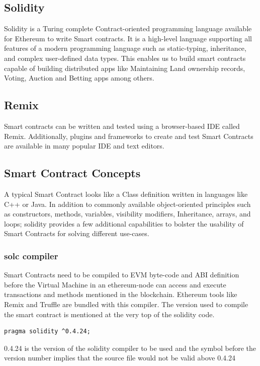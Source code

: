 \documentclass[11pt,openright]{report}
\begin{document}
\subsection{Solidity}
Solidity is a Turing complete Contract-oriented programming language available for Ethereum to write Smart contracts. It is a high-level language supporting all features of a modern programming language such as static-typing, inheritance, and complex user-defined data types. This enables us to build smart contracts capable of building distributed apps like Maintaining Land ownership records, Voting, Auction and Betting apps among others.

\subsection{Remix}
Smart contracts can be written and tested using a browser-based IDE called Remix. Additionally, plugins and frameworks to create and test Smart Contracts are available in many popular IDE and text editors.

\subsection{Smart Contract Concepts}
A typical Smart Contract looks like a Class definition written in languages like C++ or Java. In addition to commonly available object-oriented principles such as constructors, methods, variables, visibility modifiers, Inheritance, arrays, and loops; solidity provides a few additional capabilities to bolster the usability of Smart Contracts for solving different use-cases.

\subsubsection{solc compiler}
Smart Contracts need to be compiled to EVM byte-code and ABI definition before the Virtual Machine in an ethereum-node can access and execute transactions and methods mentioned in the blockchain. Ethereum tools like Remix and Truffle are bundled with this compiler. The version used to compile the smart contract is mentioned at the very top of the solidity code.

\begin{lstlisting}
pragma solidity ^0.4.24;
\end{lstlisting}

0.4.24 is the version of the solidity compiler to be used and the symbol before the version number implies that the source file would not be valid above 0.4.24
\end{document}
